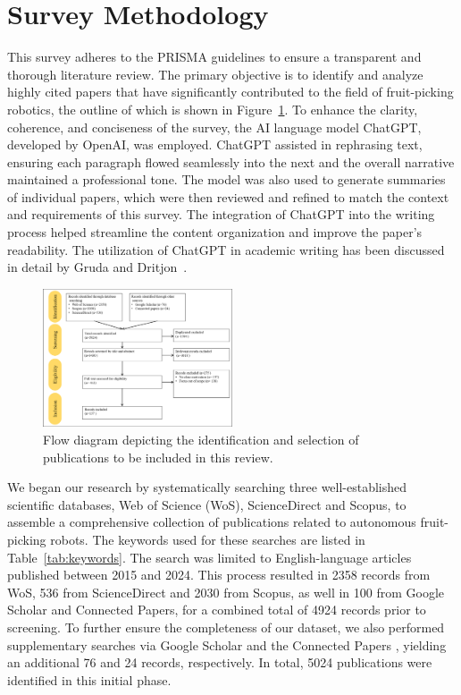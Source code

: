 \documentclass[a4paper,fleqn]{cas-dc}
\begin{document}
\section{Survey Methodology}
This survey adheres to the PRISMA guidelines to ensure a transparent and thorough literature review. The primary objective is to identify and analyze highly cited papers that have significantly contributed to the field of fruit-picking robotics, the outline of which is shown in Figure~\ref{fig:prisma1}.
To enhance the clarity, coherence, and conciseness of the survey, the AI language model ChatGPT, developed by OpenAI, was employed. ChatGPT assisted in rephrasing text, ensuring each paragraph flowed seamlessly into the next and the overall narrative maintained a professional tone. The model was also used to generate summaries of individual papers, which were then reviewed and refined to match the context and requirements of this survey. The integration of ChatGPT into the writing process helped streamline the content organization and improve the paper's readability. The utilization of ChatGPT in academic writing has been discussed in detail by Gruda and Dritjon~\cite{gruda2024three}.
\begin{figure}[h!]
    \centering
    \includegraphics[width=0.5\textwidth]{fig_prisma1.png}
    \caption{Flow diagram depicting the identification and selection of publications to be included in this review.}
    \label{fig:prisma1}
\end{figure}

We began our research by systematically searching three well-established scientific databases, Web of Science (WoS), ScienceDirect and Scopus, to assemble a comprehensive collection of publications related to autonomous fruit-picking robots. The keywords used for these searches are listed in Table~\ref{tab:keywords}. The search was limited to English-language articles published between 2015 and 2024. This process resulted in 2358 records from WoS, 536 from ScienceDirect and 2030 from Scopus, as well in 100 from Google Scholar and Connected Papers, for a combined total of 4924 records prior to screening. To further ensure the completeness of our dataset, we also performed supplementary searches via Google Scholar and the Connected Papers , yielding an additional 76 and 24 records, respectively. In total, 5024 publications were identified in this initial phase.
\end{document}
